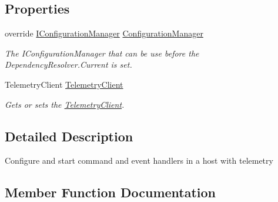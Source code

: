 \subsection*{Properties}
\begin{DoxyCompactItemize}
\item 
override \hyperlink{interfaceCqrs_1_1Configuration_1_1IConfigurationManager}{I\+Configuration\+Manager} \hyperlink{classCqrs_1_1Azure_1_1ConfigurationManager_1_1TelemetryCoreHost_a2878745a14876ad8e3914a548970232d_a2878745a14876ad8e3914a548970232d}{Configuration\+Manager}
\begin{DoxyCompactList}\small\item\em The I\+Configuration\+Manager that can be use before the Dependency\+Resolver.\+Current is set. \end{DoxyCompactList}\item 
Telemetry\+Client \hyperlink{classCqrs_1_1Azure_1_1ConfigurationManager_1_1TelemetryCoreHost_a8fe3736539c6f97ea4ac088cebbc19e5_a8fe3736539c6f97ea4ac088cebbc19e5}{Telemetry\+Client}
\begin{DoxyCompactList}\small\item\em Gets or sets the \hyperlink{classCqrs_1_1Azure_1_1ConfigurationManager_1_1TelemetryCoreHost_a8fe3736539c6f97ea4ac088cebbc19e5_a8fe3736539c6f97ea4ac088cebbc19e5}{Telemetry\+Client}. \end{DoxyCompactList}\end{DoxyCompactItemize}


\subsection{Detailed Description}
Configure and start command and event handlers in a host with telemetry 



\subsection{Member Function Documentation}
\mbox{\label{classCqrs_1_1Azure_1_1ConfigurationManager_1_1TelemetryCoreHost_abcb4e14f33f2b85b95a2b80c4555748a_abcb4e14f33f2b85b95a2b80c4555748a}} 
